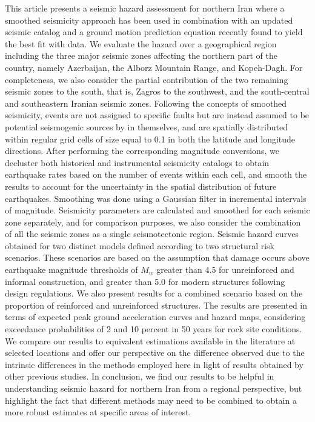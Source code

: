 % 
This article presents a seismic hazard assessment for northern Iran where a smoothed seismicity approach has been used in combination with an updated seismic catalog and a ground motion prediction equation recently found to yield the best fit with data. We evaluate the hazard over a geographical region including the three major seismic zones affecting the northern part of the country, namely Azerbaijan, the Alborz Mountain Range, and Kopeh-Dagh. For completeness, we also consider the partial contribution of the two remaining seismic zones to the south, that is, Zagros to the southwest, and the south-central and southeastern Iranian seismic zones. Following the concepts of smoothed seismicity, events are not assigned to specific faults but are instead assumed to be potential seismogenic sources by in themselves, and are spatially distributed within regular grid cells of size equal to 0.1\textdegree{} in both the latitude and longitude directions. After performing the corresponding magnitude conversions, we decluster both historical and instrumental seismicity catalogs to obtain earthquake rates based on the number of events within each cell, and smooth the results to account for the uncertainty in the spatial distribution of future earthquakes. Smoothing was done using a Gaussian filter in incremental intervals of magnitude. Seismicity parameters are calculated and smoothed for each seismic zone separately, and for comparison purposes, we also consider the combination of all the seismic zones as a single seismotectonic region. Seismic hazard curves obtained for two distinct models defined according to two structural risk scenarios. These scenarios are based on the assumption that damage occurs above earthquake magnitude thresholds of $M_w$ greater than 4.5 for unreinforced and informal construction, and greater than 5.0 for modern structures following design regulations. We also present results for a combined scenario based on the proportion of reinforced and unreinforced structures. The results are presented in terms of expected peak ground acceleration curves and hazard maps, considering exceedance probabilities of 2 and 10 percent in 50 years for rock site conditions. We compare our results to equivalent estimations available in the literature at selected locations and offer our perspective on the difference observed due to the intrinsic differences in the methods employed here in light of results obtained by other previous studies. In conclusion, we find our results to be helpful in understanding seismic hazard for northern Iran from a regional perspective, but highlight the fact that different methods may need to be combined to obtain a more robust estimates at specific areas of interest.


